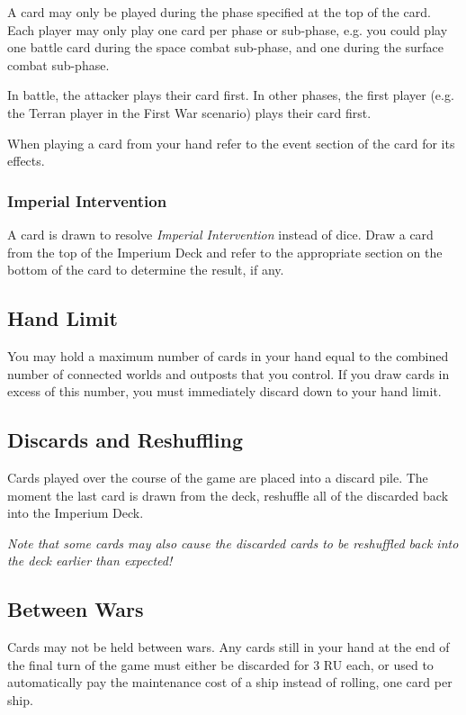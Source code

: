 A card may only be played during the phase specified at the top of the card. Each player may only play one card per phase or sub-phase, e.g. you could play one battle card during the space combat sub-phase, and one during the surface combat sub-phase.

In battle, the attacker plays their card first. In other phases, the first player (e.g. the Terran player in the First War scenario) plays their card first.

When playing a card from your hand refer to the event section of the card for its effects.

\subsubsection{Imperial Intervention}

A card is drawn to resolve \textit{Imperial Intervention} instead of dice. Draw a card from the top of the Imperium Deck and refer to the appropriate section on the bottom of the card to determine the result, if any.

\subsection{Hand Limit}

You may hold a maximum number of cards in your hand equal to the combined number of connected worlds and outposts that you control. If you draw cards in excess of this number, you must immediately discard down to your hand limit.

\subsection{Discards and Reshuffling}

Cards played over the course of the game are placed into a discard pile. The moment the last card is drawn from the deck, reshuffle all of the discarded back into the Imperium Deck.

\textit{Note that some cards may also cause the discarded cards to be reshuffled back into the deck earlier than expected!}

\subsection{Between Wars}

Cards may not be held between wars. Any cards still in your hand at the end of the final turn of the game must either be discarded for 3 RU each, or used to automatically pay the maintenance cost of a ship instead of rolling, one card per ship.

